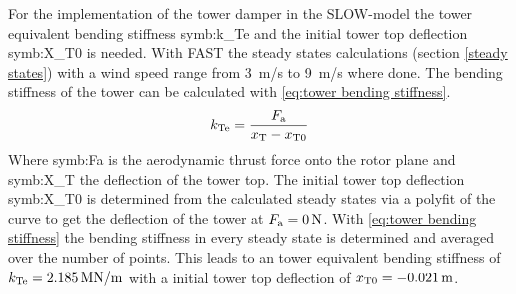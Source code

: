 For the implementation of the tower damper in the \gls{SLOW}-model the tower equivalent bending stiffness \gls{symb:k_Te} and the initial tower top deflection \gls{symb:X_T0} is needed. 
With \gls{FAST} the steady states calculations (section \ref{steady states}) with a wind speed range from \SI{3}{m/s} to \SI{9}{m/s} where done.
The bending stiffness of the tower can be calculated with \ref{eq:tower bending stiffness}.
\begin{equation}
	k_{\textnormal{Te}} = \frac{F_\textnormal{a}}{x_\textnormal{T} - x_{\textnormal{T0}}}
	\label{eq:tower bending stiffness}
\end{equation}
Where \gls{symb:Fa} is the aerodynamic thrust force onto the rotor plane and \gls{symb:X_T} the deflection of the tower top.
The initial tower top deflection \gls{symb:X_T0} is determined from the calculated steady states via a polyfit of the curve to get the deflection of the tower at $F_\textnormal{a} = \SI{0}{N}$.
With \ref{eq:tower bending stiffness} the bending stiffness in every steady state is determined and averaged over the number of points. 
This leads to an tower equivalent bending stiffness of $k_\textnormal{Te} = \SI{2.185}{\mega \newton /\meter}$ with a initial tower top deflection of $x_\textnormal{T0} = \SI{-0.021}{m}$.
